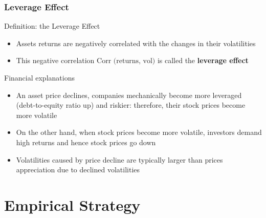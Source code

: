 \documentclass{beamer}
\begin{document}
\begin{frame}
  \frametitle{Leverage Effect}

  \begin{block}{Definition: the Leverage Effect}
    \begin{itemize}
    \item Assets returns are negatively correlated with the changes in their volatilities
    \item This negative correlation $\text{Corr (returns, vol)}$ is called the \textbf{leverage effect}
    \end{itemize}

Financial explanations
    \begin{itemize}
    \item An asset price declines, companies mechanically become more leveraged (debt-to-equity ratio up) and riskier: therefore, their stock prices become more volatile
    \item On the other hand, when stock prices become more volatile, investors demand high returns and hence stock prices go down
    \item Volatilities caused by price decline are typically larger than prices appreciation due to declined volatilities
    \end{itemize}
    
  \end{block}
  
\end{frame}

\section{Empirical Strategy}
\end{document}
